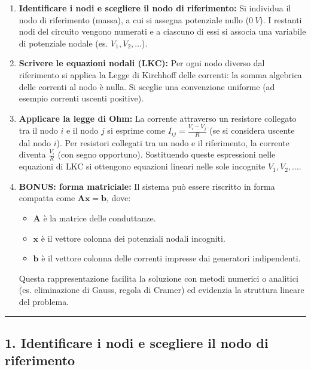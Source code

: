 \begin{enumerate}
    \item \textbf{Identificare i nodi e scegliere il nodo di riferimento:} 
    Si individua il nodo di riferimento (massa), a cui si assegna potenziale nullo ($\SI{0}{V}$). I restanti nodi del circuito vengono numerati e a ciascuno di essi si associa una variabile di potenziale nodale (es. $V_1, V_2, \dots$).

    \item \textbf{Scrivere le equazioni nodali (LKC):} 
    Per ogni nodo diverso dal riferimento si applica la Legge di Kirchhoff delle correnti: la somma algebrica delle correnti al nodo è nulla. Si sceglie una convenzione uniforme (ad esempio correnti uscenti positive).

    \item \textbf{Applicare la legge di Ohm:} 
    La corrente attraverso un resistore collegato tra il nodo $i$ e il nodo $j$ si esprime come $I_{ij} = \frac{V_i - V_j}{R}$ (se si considera uscente dal nodo $i$). Per resistori collegati tra un nodo e il riferimento, la corrente diventa $\frac{V_i}{R}$ (con segno opportuno). Sostituendo queste espressioni nelle equazioni di LKC si ottengono equazioni lineari nelle sole incognite $V_1, V_2, \dots$.

    \item \textbf{BONUS: forma matriciale:} 
    Il sistema può essere riscritto in forma compatta come $\mathbf{A} \mathbf{x} = \mathbf{b}$, dove:
    \begin{itemize}
        \item $\mathbf{A}$ è la matrice delle conduttanze.
        \item $\mathbf{x}$ è il vettore colonna dei potenziali nodali incogniti.
        \item $\mathbf{b}$ è il vettore colonna delle correnti impresse dai generatori indipendenti.
    \end{itemize}
    Questa rappresentazione facilita la soluzione con metodi numerici o analitici (es. eliminazione di Gauss, regola di Cramer) ed evidenzia la struttura lineare del problema.
\end{enumerate}

\hrule

\subsection*{1. Identificare i nodi e scegliere il nodo di riferimento}

